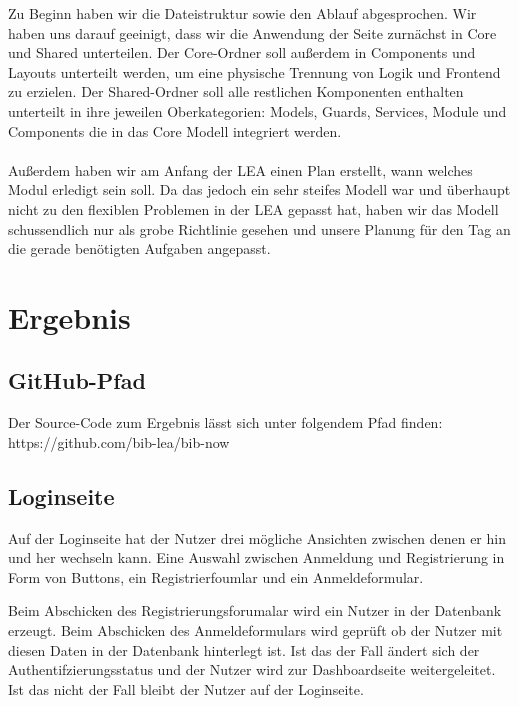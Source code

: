 \documentclass[12pt,titlepage]{article}
\begin{document}
Zu Beginn haben wir die Dateistruktur sowie den Ablauf abgesprochen. Wir haben uns darauf geeinigt, dass wir die Anwendung der Seite zurnächst in Core und Shared unterteilen. Der Core-Ordner soll außerdem in Components und Layouts unterteilt werden, um eine physische Trennung von Logik und Frontend zu erzielen. Der Shared-Ordner soll alle restlichen Komponenten enthalten unterteilt in ihre jeweilen Oberkategorien: Models, Guards, Services, Module und Components die in das Core Modell integriert werden. \\ \\

Außerdem haben wir am Anfang der LEA einen Plan erstellt, wann welches Modul erledigt sein soll. Da das jedoch ein sehr steifes Modell war und überhaupt nicht zu den flexiblen Problemen in der LEA gepasst hat, haben wir das Modell schussendlich nur als grobe Richtlinie gesehen und unsere Planung für den Tag an die gerade benötigten Aufgaben angepasst.

\newpage
\section{Ergebnis}

\subsection{GitHub-Pfad}

Der Source-Code zum Ergebnis lässt sich unter folgendem Pfad finden: \\
https://github.com/bib-lea/bib-now

\subsection{Loginseite}

Auf der Loginseite hat der Nutzer drei mögliche Ansichten zwischen denen er hin und her wechseln kann. Eine Auswahl zwischen Anmeldung und Registrierung in Form von Buttons, ein Registrierfoumlar und ein Anmeldeformular.

Beim Abschicken des Registrierungsforumalar wird ein Nutzer in der Datenbank erzeugt. Beim Abschicken des Anmeldeformulars wird geprüft ob der Nutzer mit diesen Daten in der Datenbank hinterlegt ist. Ist das der Fall ändert sich der Authentifzierungsstatus und der Nutzer wird zur Dashboardseite weitergeleitet. Ist das nicht der Fall bleibt der Nutzer auf der Loginseite.
\end{document}
